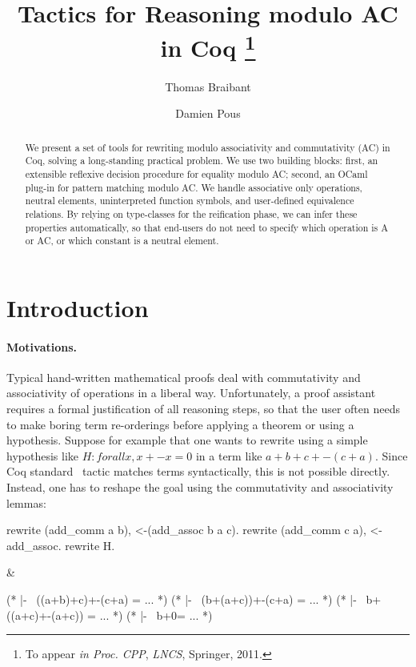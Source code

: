 \documentclass{llncs}
\title{Tactics for Reasoning modulo AC in Coq \thanks{To appear \emph{in Proc. CPP}, \emph{LNCS}, Springer, 2011.}}\author{Thomas Braibant \and Damien Pous} \institute{LIG, UMR 5217, CNRS, INRIA, Grenoble}
\begin{document}
\maketitle

\begin{abstract}
  We present a set of tools for rewriting modulo associativity and
  commutativity (AC) in Coq, solving a long-standing practical
  problem. We use two building blocks: first, an extensible reflexive
  decision procedure for equality modulo AC; second, an OCaml plug-in
  for pattern matching modulo AC.
We handle associative only operations, neutral elements,
  uninterpreted function symbols, and user-defined equivalence
  relations.
By relying on type-classes for the reification phase, we can infer
  these properties automatically, so that end-users do not need to
  specify which operation is A or AC, or which constant is a neutral
  element.
\end{abstract}


\section{Introduction}

\paragraph*{Motivations.}

Typical hand-written mathematical proofs deal with commutativity and
associativity of operations in a liberal way. Unfortunately, a proof
assistant requires a formal justification of all reasoning steps, so
that the user often needs to make boring term re-orderings before
applying a theorem or using a hypothesis.
Suppose for example that one wants to rewrite using a simple
hypothesis like \coqinline$H: forallx, x+-x = 0$ in a term like \coqinline$a+b+c+-(c+a)$. Since Coq standard \rewrite\ tactic matches
terms syntactically, this is not possible directly. Instead, one has
to reshape the goal using the commutativity and associativity lemmas:

\begin{twolistings}
\begin{coq}
\ttab rewrite (add_comm a b), <-(add_assoc b a c).
\ttab rewrite (add_comm c a), <-add_assoc.
\ttab rewrite H. 
\end{coq}&
\begin{coq}
(* |-~ ((a+b)+c)+-(c+a) = ... *)\ttab
(* |-~ (b+(a+c))+-(c+a) = ... *)
(* |-~ b+((a+c)+-(a+c)) = ... *)
(* |-~ b+0\ttab\ttab\ttab\tab= ... *)
\end{coq}
\end{twolistings}
\end{document}
